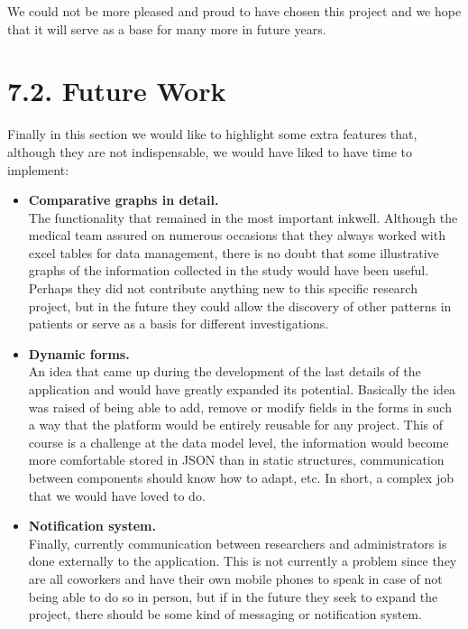     We could not be more pleased and proud to have chosen this project and we hope that it will serve as a base for many more in future years. \newpage
    
 \section*{7.2. Future Work}
      
Finally in this section we would like to highlight some extra features that, although they are not indispensable, we would have liked to have time to implement:
 \newline
 
 \begin{itemize}
  \item\textbf{Comparative graphs in detail.} \\
The functionality that remained in the most important inkwell. Although the medical team assured on numerous occasions that they always worked with excel tables for data management, there is no doubt that some illustrative graphs of the information collected in the study would have been useful. Perhaps they did not contribute anything new to this specific research project, but in the future they could allow the discovery of other patterns in patients or serve as a basis for different investigations. \\
  
  \item\textbf{Dynamic forms.} \\
  An idea that came up during the development of the last details of the application and would have greatly expanded its potential. Basically the idea was raised of being able to add, remove or modify fields in the forms in such a way that the platform would be entirely reusable for any project. This of course is a challenge at the data model level, the information would become more comfortable stored in JSON than in static structures, communication between components should know how to adapt, etc. In short, a complex job that we would have loved to do. \\
  
  \item\textbf{Notification system.} \\
  Finally, currently communication between researchers and administrators is done externally to the application. This is not currently a problem since they are all coworkers and have their own mobile phones to speak in case of not being able to do so in person, but if in the future they seek to expand the project, there should be some kind of messaging or notification system.
  \newline
  

\end{itemize}
